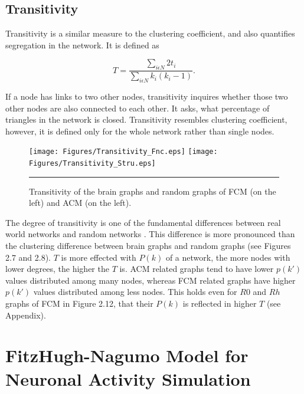 \subsection{Transitivity}

Transitivity is a similar measure to the clustering coefficient, and also quantifies segregation in the network. It is defined as \citep{NEW03}
	
\begin{equation}
 T = \frac{\sum\limits_{i \epsilon N} 2 t_i}{\sum\limits_{i \epsilon N}k_i (k_i - 1)} .
\end{equation}	

If a node has links to two other nodes, transitivity inquires whether those two other nodes are also connected to each other. It asks, what percentage of triangles in the network is closed. Transitivity resembles clustering coefficient, however, it is defined only for the whole network rather than single nodes. 

\begin{figure}[htbp]
  \centering
	\texttt{[image: Figures/Transitivity\_Fnc.eps]}
	\texttt{[image: Figures/Transitivity\_Stru.eps]} 
    \rule{35em}{0.5pt}
    \caption[Transitivity]{Transitivity of the brain graphs and random graphs of FCM (on the left) and ACM (on the left). }
  \label{fig:Transitivity}
\end{figure}


The degree of transitivity is one of the fundamental differences between real world networks and random networks \citep{NEW10}. This difference is more pronounced than the clustering difference between brain graphs and random graphs (see Figures 2.7 and 2.8). $T$ is more effected with $P(k)$ of a network, the more nodes with lower degrees, the higher the $T$ is. ACM related graphs tend to have lower $p(k')$ values distributed among many nodes, whereas FCM related graphs have higher $p(k')$ values distributed among less nodes. This holds even for $R0$ and $Rh$ graphs of FCM in Figure 2.12, that their $P(k)$ is reflected in higher $T$ (see Appendix).



\section{FitzHugh-Nagumo Model for Neuronal Activity Simulation}

